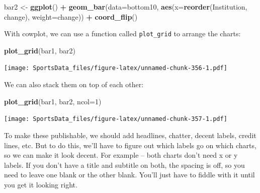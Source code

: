 \documentclass[
]{book}
\newenvironment{Shaded}{\begin{snugshade}}{\end{snugshade}}
\newcommand{\DataTypeTok}[1]{\textcolor[rgb]{0.13,0.29,0.53}{#1}}
\newcommand{\DecValTok}[1]{\textcolor[rgb]{0.00,0.00,0.81}{#1}}
\newcommand{\KeywordTok}[1]{\textcolor[rgb]{0.13,0.29,0.53}{\textbf{#1}}}
\newcommand{\NormalTok}[1]{#1}
\newcommand{\OperatorTok}[1]{\textcolor[rgb]{0.81,0.36,0.00}{\textbf{#1}}}
\newcommand{\StringTok}[1]{\textcolor[rgb]{0.31,0.60,0.02}{#1}}
\begin{document}
\begin{Shaded}
\begin{Highlighting}[]
\NormalTok{bar2 <-}\StringTok{ }\KeywordTok{ggplot}\NormalTok{() }\OperatorTok{+}\StringTok{ }\KeywordTok{geom_bar}\NormalTok{(}\DataTypeTok{data=}\NormalTok{bottom10, }\KeywordTok{aes}\NormalTok{(}\DataTypeTok{x=}\KeywordTok{reorder}\NormalTok{(Institution, change), }\DataTypeTok{weight=}\NormalTok{change)) }\OperatorTok{+}\StringTok{ }\KeywordTok{coord_flip}\NormalTok{()}
\end{Highlighting}
\end{Shaded}

With cowplot, we can use a function called \texttt{plot\_grid} to arrange the charts:

\begin{Shaded}
\begin{Highlighting}[]
\KeywordTok{plot_grid}\NormalTok{(bar1, bar2) }
\end{Highlighting}
\end{Shaded}

\texttt{[image: SportsData\_files/figure-latex/unnamed-chunk-356-1.pdf]}

We can also stack them on top of each other:

\begin{Shaded}
\begin{Highlighting}[]
\KeywordTok{plot_grid}\NormalTok{(bar1, bar2, }\DataTypeTok{ncol=}\DecValTok{1}\NormalTok{) }
\end{Highlighting}
\end{Shaded}

\texttt{[image: SportsData\_files/figure-latex/unnamed-chunk-357-1.pdf]}

To make these publishable, we should add headlines, chatter, decent labels, credit lines, etc. But to do this, we'll have to figure out which labels go on which charts, so we can make it look decent. For example -- both charts don't need x or y labels. If you don't have a title and subtitle on both, the spacing is off, so you need to leave one blank or the other blank. You'll just have to fiddle with it until you get it looking right.
\end{document}
